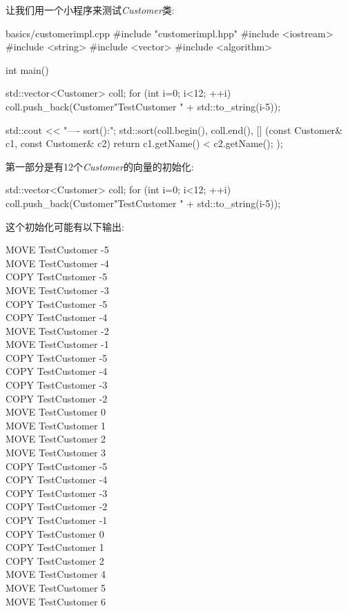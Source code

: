 
让我们用一个小程序来测试\textit{Customer}类:\par

\begin{codeboxt}[cpp]{basics/customerimpl.cpp}
#include "customerimpl.hpp"
#include <iostream>
#include <string>
#include <vector>
#include <algorithm>

int main()
{
  std::vector<Customer> coll;
  for (int i=0; i<12; ++i) {
    coll.push_back(Customer{"TestCustomer " + std::to_string(i-5)});
  }

  std::cout << "---- sort():\n";
  std::sort(coll.begin(), coll.end(),
        [] (const Customer& c1, const Customer& c2) {
           return c1.getName() < c2.getName();
        });
}
\end{codeboxt}


第一部分是有12个\textit{Customer}的向量的初始化:\par

\begin{codebox}[cpp]
std::vector<Customer> coll;
for (int i=0; i<12; ++i) {
  coll.push_back(Customer{"TestCustomer " + std::to_string(i-5)});
}
\end{codebox}

这个初始化可能有以下输出:\par

\begin{myOutput}
MOVE TestCustomer -5 \\
MOVE TestCustomer -4 \\
COPY TestCustomer -5 \\
MOVE TestCustomer -3 \\
COPY TestCustomer -5 \\
COPY TestCustomer -4 \\
MOVE TestCustomer -2 \\
MOVE TestCustomer -1 \\
COPY TestCustomer -5 \\
COPY TestCustomer -4 \\
COPY TestCustomer -3 \\
COPY TestCustomer -2 \\
MOVE TestCustomer 0 \\
MOVE TestCustomer 1 \\
MOVE TestCustomer 2 \\
MOVE TestCustomer 3 \\
COPY TestCustomer -5 \\
COPY TestCustomer -4 \\
COPY TestCustomer -3 \\
COPY TestCustomer -2 \\
COPY TestCustomer -1 \\
COPY TestCustomer 0 \\
COPY TestCustomer 1 \\
COPY TestCustomer 2 \\
MOVE TestCustomer 4 \\
MOVE TestCustomer 5 \\
MOVE TestCustomer 6 \\
\end{myOutput}

